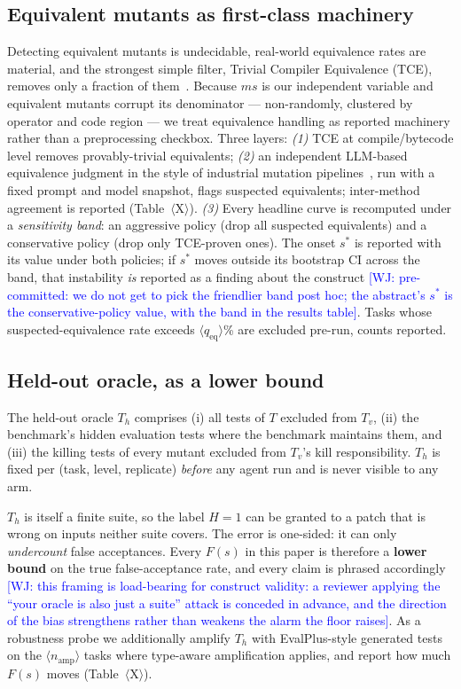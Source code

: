 \documentclass[conference]{IEEEtran}
\newcommand{\PH}[1]{\colorbox{gray!18}{\small$\langle$#1$\rangle$}}
\newcommand{\wj}[1]{\textcolor{blue}{\footnotesize [WJ: #1]}}
\newcommand{\ms}{\ensuremath{\mathit{ms}}}
\newcommand{\Fs}{\ensuremath{F(s)}}
\begin{document}
\subsection{Equivalent mutants as first-class machinery}\label{sec:equiv}
Detecting equivalent mutants is undecidable, real-world equivalence rates
are material, and the strongest simple filter, Trivial Compiler
Equivalence (TCE), removes only a fraction of
them~\cite{Papadakis2015TCE,Papadakis2019Survey}. Because \ms{} is our
independent variable and equivalent mutants corrupt its denominator ---
non-randomly, clustered by operator and code region --- we treat
equivalence handling as reported machinery rather than a preprocessing
checkbox. Three layers: \emph{(1)} TCE at compile/bytecode level removes
provably-trivial equivalents; \emph{(2)} an independent LLM-based
equivalence judgment in the style of industrial mutation
pipelines~\cite{Foster2025ACH}, run with a fixed prompt and model
snapshot, flags suspected equivalents; inter-method agreement is reported
(Table~\PH{X}). \emph{(3)} Every headline curve is recomputed under a
\emph{sensitivity band}: an aggressive policy (drop all suspected
equivalents) and a conservative policy (drop only TCE-proven ones). The
onset $s^\ast$ is reported with its value under both policies; if
$s^\ast$ moves outside its bootstrap CI across the band, that instability
\emph{is} reported as a finding about the construct
\wj{pre-committed: we do not get to pick the friendlier band post hoc;
the abstract's $s^\ast$ is the conservative-policy value, with the band
in the results table}. Tasks whose suspected-equivalence rate exceeds
\PH{$q_{\mathrm{eq}}$}\% are excluded pre-run, counts reported.

\subsection{Held-out oracle, as a lower bound}\label{sec:oracle}
The held-out oracle $T_h$ comprises (i) all tests of $T$ excluded from
$T_v$, (ii) the benchmark's hidden evaluation tests where the benchmark
maintains them, and (iii) the killing tests of every mutant excluded from
$T_v$'s kill responsibility. $T_h$ is fixed per (task, level, replicate)
\emph{before} any agent run and is never visible to any arm.

$T_h$ is itself a finite suite, so the label $H{=}1$ can be granted to a
patch that is wrong on inputs neither suite covers. The error is
one-sided: it can only \emph{undercount} false acceptances. Every \Fs{}
in this paper is therefore a \textbf{lower bound} on the true
false-acceptance rate, and every claim is phrased accordingly
\wj{this framing is load-bearing for construct validity: a reviewer
applying the ``your oracle is also just a suite'' attack is conceded in
advance, and the direction of the bias strengthens rather than weakens
the alarm the floor raises}. As a robustness probe we additionally
amplify $T_h$ with EvalPlus-style generated
tests~\cite{EvalPlus_Liu2023} on the \PH{$n_{\mathrm{amp}}$} tasks where
type-aware amplification applies, and report how much \Fs{} moves
(Table~\PH{X}).
\end{document}

